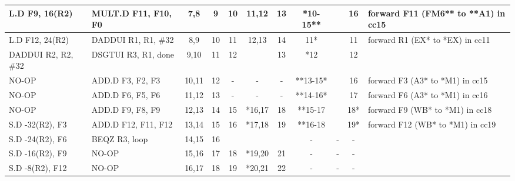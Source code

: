 \begin{table}[b]
{\begin{tabular}{|l|l|c|c|c|c|c|c|c|c|l|}
	L.D            F9, 16(R2)      & MULT.D     F11, F10, F0   & 7,8   & 9  & 10        & 11,12  & 13 & *10-15** &   & 16  & forward F11 (FM6** to   **A1) in cc15 \\ \hline
	L.D            F12, 24(R2)     & DADDUI     R1, R1, \#32   & 8,9   & 10 & 11        & 12,13  & 14 & 11*      &   & 11  & forward R1 (EX* to   *EX) in cc11     \\ \hline
	DADDUI     R2, R2, \#32        & DSGTUI     R3, R1, done   & 9,10  & 11 & 12        &        & 13 & *12      &   & 12  &                                       \\ \hline
	NO-OP                          & ADD.D       F3, F2, F3    & 10,11 & 12 & -         & -      & -  & **13-15* &   & 16  & forward F3 (A3* to   *M1) in cc15     \\ \hline
	NO-OP                          & ADD.D       F6, F5, F6    & 11,12 & 13 & -         & -      & -  & **14-16* &   & 17  & forward F6 (A3* to   *M1) in cc16     \\ \hline
	NO-OP			    & ADD.D       F9, F8, F9    & 12,13 & 14 & 15        & *16,17 & 18 & **15-17  &   & 18* & forward F9 (WB* to   *M1) in cc18     \\ \hline
	S.D            -32(R2), F3     & ADD.D       F12, F11, F12 & 13,14 & 15 & 16        & *17,18 & 19 & **16-18  &   & 19* & forward F12 (WB* to   *M1) in cc19    \\ \hline
	S.D            -24(R2), F6     & BEQZ         R3, loop                     & 14,15 & 16 & \textbf{} &        &    & -        & - & -   &                                       \\ \hline
	S.D            -16(R2), F9     & NO-OP                     & 15,16 & 17 & 18        & *19,20 & 21 & -        & - & -   &                                       \\ \hline
	S.D            -8(R2), F12     & NO-OP                     & 16,17 & 18 & 19        & *20,21 & 22 & -        & - & -   &                                       \\ \hline
\end{tabular}
}
\end{table}